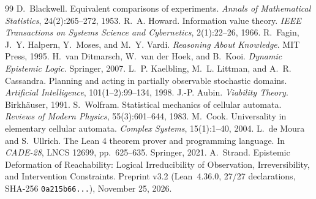 \documentclass[10pt,a4paper]{article}
\newcommand{\code}[1]{\nolinkurl{#1}}
\begin{document}
\begin{thebibliography}{99}
\small
{} D.~Blackwell. Equivalent comparisons of experiments. \emph{Annals of Mathematical Statistics}, 24(2):265--272, 1953.
 R.~A. Howard. Information value theory. \emph{IEEE Transactions on Systems Science and Cybernetics}, 2(1):22--26, 1966.
 R.~Fagin, J.~Y. Halpern, Y.~Moses, and M.~Y. Vardi. \emph{Reasoning About Knowledge}. MIT Press, 1995.
 H.~van Ditmarsch, W.~van der Hoek, and B.~Kooi. \emph{Dynamic Epistemic Logic}. Springer, 2007.
 L.~P. Kaelbling, M.~L. Littman, and A.~R. Cassandra. Planning and acting in partially observable stochastic domains. \emph{Artificial Intelligence}, 101(1--2):99--134, 1998.
 J.-P. Aubin. \emph{Viability Theory}. Birkh\"auser, 1991.
 S.~Wolfram. Statistical mechanics of cellular automata. \emph{Reviews of Modern Physics}, 55(3):601--644, 1983.
 M.~Cook. Universality in elementary cellular automata. \emph{Complex Systems}, 15(1):1--40, 2004.
 L.~de Moura and S.~Ullrich. The Lean 4 theorem prover and programming language. In \emph{CADE-28}, LNCS 12699, pp.~625--635. Springer, 2021.
 A.~Strand. Epistemic Deformation of Reachability: Logical Irreducibility of Observation, Irreversibility, and Intervention Constraints. Preprint v3.2 (Lean~4.36.0, 27/27 declarations, SHA-256 \code{0a215b66...}), November 25, 2026.
\end{thebibliography}
\end{document}
